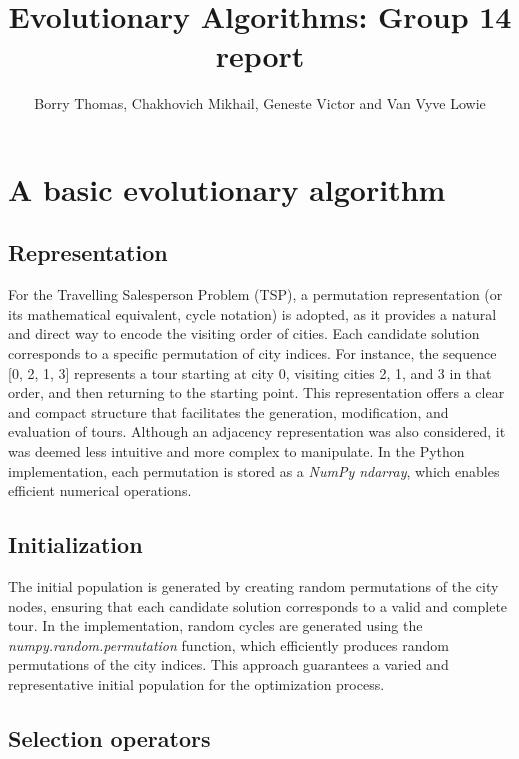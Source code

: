 \documentclass[a4paper,10pt]{article}
\title{Evolutionary Algorithms: Group 14 report}
\author{Borry Thomas, Chakhovich Mikhail, Geneste Victor and Van Vyve Lowie}
\begin{document}
\selectfont{}

\maketitle




\section{A basic evolutionary algorithm}

\subsection{Representation}

For the Travelling Salesperson Problem (TSP), a permutation representation (or its mathematical equivalent, cycle notation) is adopted, as it provides a natural and direct way to encode the visiting order of cities. Each candidate solution corresponds to a specific permutation of city indices. For instance, the sequence [0, 2, 1, 3] represents a tour starting at city 0, visiting cities 2, 1, and 3 in that order, and then returning to the starting point. This representation offers a clear and compact structure that facilitates the generation, modification, and evaluation of tours. Although an adjacency representation was also considered, it was deemed less intuitive and more complex to manipulate. In the Python implementation, each permutation is stored as a \textit{NumPy ndarray}, which enables efficient numerical operations.

\subsection{Initialization}

The initial population is generated by creating random permutations of the city nodes, ensuring that each candidate solution corresponds to a valid and complete tour. In the implementation, random cycles are generated using the \textit{numpy.random.permutation} function, which efficiently produces random permutations of the city indices. This approach guarantees a varied and representative initial population for the optimization process.

\subsection{Selection operators}
\end{document}
